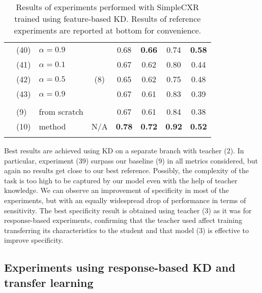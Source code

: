 \begin{table}
\begin{tabular}{c|ll|c|c|c|c|c|}
        & (40) & $\alpha=0.9$ &                      &         0.68  & \textbf{0.66} &         0.74  & \textbf{0.58} \\
        \hhline{~-------}
        & (41) & $\alpha=0.1$ & \multirow{3}{*}{(8)} &         0.67  &         0.62  &         0.80  &         0.44  \\
        & (42) & $\alpha=0.5$ &                      &         0.65  &         0.62  &         0.75  &         0.48  \\
        & (43) & $\alpha=0.9$ &                      &         0.67  &         0.61  &         0.83  &         0.39  \\
        \hhline{~-------}
        \multicolumn{8}{c}{} \\
        \hhline{~-------}
        \multirow{2}{*}{}
        & (9)  & from scratch              &                      \cellcolor{gray!25} &         0.67  &         0.61  &         0.84  &         0.38  \\
        & (10) & method \cite{iodice_2022} & \multirow{-2}{*}{N/A}\cellcolor{gray!25} & \textbf{0.78} & \textbf{0.72} & \textbf{0.92} & \textbf{0.52} \\
        \hhline{~-------}
    \end{tabular}
    \caption{Results of experiments performed with SimpleCXR trained using feature-based KD. Results of reference experiments are reported at bottom for convenience.}
    \label{tab:cxr_feature_based_kd}
\end{table}

Best results are achieved using KD on a separate branch with teacher (2).
In particular, experiment (39) surpass our baseline (9) in all metrics considered, but again no results get close to our best reference.
Possibly, the complexity of the task is too high to be captured by our model even with the help of teacher knowledge.
We can observe an improvement of specificity in most of the experiments, but with an equally widespread drop of performance in terms of sensitivity.
The best specificity result is obtained using teacher (3) as it was for response-based experiments, confirming that the teacher used affect training transferring its characteristics to the student and that model (3) is effective to improve specificity.


\subsection{Experiments using response-based KD and transfer learning}

